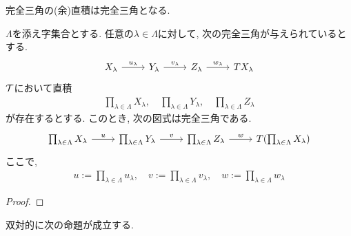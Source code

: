 \documentclass[uplatex, a4paper, 14Q, dvipdfmx]{jsarticle}
\begin{document}
完全三角の(余)直積は完全三角となる. 

\begin{theorem} \label{preserve_prod}
  $\Lambda$を添え字集合とする. 
  任意の$\lambda \in \Lambda$に対して, 次の完全三角が与えられているとする. 
  \[\begin{tikzcd}
    {X_\lambda} & {Y_\lambda} & {Z_\lambda} & {TX_\lambda}
    \arrow["{u_\lambda}", from=1-1, to=1-2]
    \arrow["{v_\lambda}", from=1-2, to=1-3]
    \arrow["{w_\lambda}", from=1-3, to=1-4]
  \end{tikzcd}\]
  $\mathcal{T}$において直積
  \begin{align*}
    \prod_{\lambda \in \Lambda} X_\lambda, \quad
    \prod_{\lambda \in \Lambda} Y_\lambda, \quad
    \prod_{\lambda \in \Lambda} Z_\lambda
  \end{align*}
  が存在するとする. 
  このとき, 次の図式は完全三角である. 
  \[\begin{tikzcd}
    {\prod_{\lambda \in \Lambda} X_\lambda} & {\prod_{\lambda \in \Lambda} Y_\lambda} & {\prod_{\lambda \in \Lambda} Z_\lambda} & {T(\prod_{\lambda \in \Lambda} X_\lambda)}
    \arrow["{u}", from=1-1, to=1-2]
    \arrow["{v}", from=1-2, to=1-3]
    \arrow["{w}", from=1-3, to=1-4]
  \end{tikzcd}\]
  ここで, 
  \begin{align*}
    u:= \prod_{\lambda \in \Lambda} u_\lambda, \quad
    v:= \prod_{\lambda \in \Lambda} v_\lambda, \quad
    w:= \prod_{\lambda \in \Lambda} w_\lambda
  \end{align*}
\end{theorem}

\begin{proof}
  
\end{proof}

双対的に次の命題が成立する. 
\end{document}
